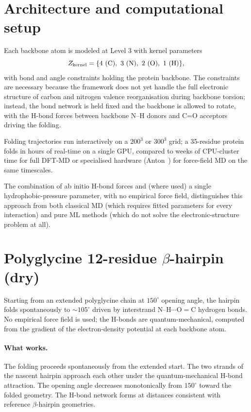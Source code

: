 \section{Architecture and computational setup}\label{sec:fold-setup}

Each backbone atom is modeled at Level 3 with kernel parameters
\[
Z_{\rm kernel} = \{4 \text{ (C)},\ 3 \text{ (N)},\ 2 \text{ (O)},\ 1 \text{ (H)}\},
\]
with bond and angle constraints holding the protein backbone. The constraints are necessary because the framework does not yet handle the full electronic structure of carbon and nitrogen valence reorganisation during backbone torsion; instead, the bond network is held fixed and the backbone is allowed to rotate, with the H-bond forces between backbone N--H donors and C=O acceptors driving the folding.

Folding trajectories run interactively on a $200^3$ or $300^3$ grid; a 35-residue protein folds in hours of real-time on a single GPU, compared to weeks of CPU-cluster time for full DFT-MD or specialised hardware (Anton~\cite{Shaw10}) for force-field MD on the same timescales.

The combination of ab initio H-bond forces and (where used) a single hydrophobic-pressure parameter, with no empirical force field, distinguishes this approach from both classical MD (which requires fitted parameters for every interaction) and pure ML methods (which do not solve the electronic-structure problem at all).

\section{Polyglycine 12-residue $\beta$-hairpin (dry)}\label{sec:hairpin}

Starting from an extended polyglycine chain at $150^\circ$ opening angle, the hairpin folds spontaneously to $\sim 105^\circ$ driven by interstrand N--H$\cdots$O$=$C hydrogen bonds. No empirical force field is used; the H-bonds are quantum-mechanical, computed from the gradient of the electron-density potential at each backbone atom.

\paragraph{What works.} The folding proceeds spontaneously from the extended start. The two strands of the nascent hairpin approach each other under the quantum-mechanical H-bond attraction. The opening angle decreases monotonically from $150^\circ$ toward the folded geometry. The H-bond network forms at distances consistent with reference $\beta$-hairpin geometries.

